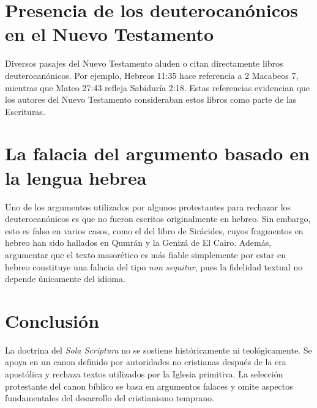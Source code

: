 \documentclass[12pt]{article}
\begin{document}
\section{Presencia de los deuterocanónicos en el Nuevo Testamento}

Diversos pasajes del Nuevo Testamento aluden o citan directamente libros deuterocanónicos. Por ejemplo, Hebreos 11:35 hace referencia a 2 Macabeos 7, mientras que Mateo 27:43 refleja Sabiduría 2:18. Estas referencias evidencian que los autores del Nuevo Testamento consideraban estos libros como parte de las Escrituras.

\section{La falacia del argumento basado en la lengua hebrea}

Uno de los argumentos utilizados por algunos protestantes para rechazar los deuterocanónicos es que no fueron escritos originalmente en hebreo. Sin embargo, esto es falso en varios casos, como el del libro de Sirácides, cuyos fragmentos en hebreo han sido hallados en Qumrán y la Genizá de El Cairo. Además, argumentar que el texto masorético es más fiable simplemente por estar en hebreo constituye una falacia del tipo \textit{non sequitur}, pues la fidelidad textual no depende únicamente del idioma.

\section{Conclusión}

La doctrina del \textit{Sola Scriptura} no se sostiene históricamente ni teológicamente. Se apoya en un canon definido por autoridades no cristianas después de la era apostólica y rechaza textos utilizados por la Iglesia primitiva. La selección protestante del canon bíblico se basa en argumentos falaces y omite aspectos fundamentales del desarrollo del cristianismo temprano.

\printbibliography
\end{document}
